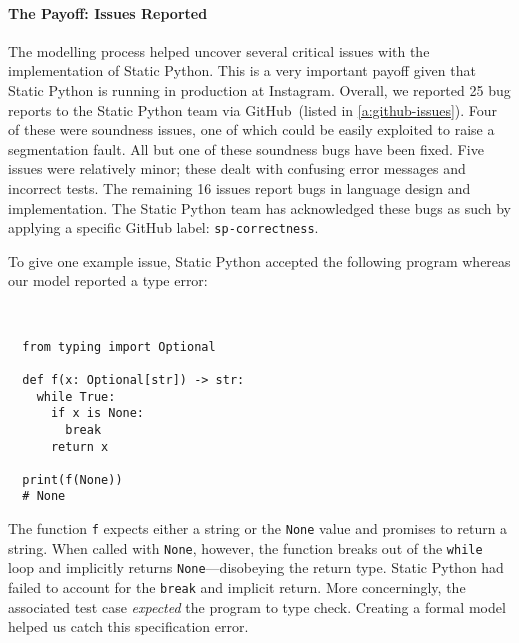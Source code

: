 \documentclass[english,cleveref,submission]{programming}
\newcommand{\SP}{Static Python}
\newcommand{\code}[1]{\texttt{#1}}
\begin{document}
\paragraph{The Payoff: Issues Reported}

The modelling process helped uncover several critical issues with the
implementation of \SP{}.
This is a very important payoff given that \SP{} is running in production at
Instagram.
Overall, we reported 25 bug reports to the \SP{} team via GitHub~(listed in
\cref{a:github-issues}).
Four of these were soundness issues, one of which could be easily exploited to raise
a segmentation fault.
All but one of these soundness bugs have been fixed.
Five issues were relatively minor; these dealt with confusing error messages
and incorrect tests.
The remaining 16 issues report bugs in language design and implementation.
The \SP{} team has acknowledged these bugs as such by applying a specific GitHub label: \lstinline{sp-correctness}.

To give one example issue, \SP{} accepted the following program whereas our model
reported a type error:

\medskip
\begin{minipage}[t]{0.25\columnwidth}~
\end{minipage}\begin{minipage}[t]{0.4\columnwidth}
\begin{lstlisting}
  from typing import Optional

  def f(x: Optional[str]) -> str:
    while True:
      if x is None:
        break
      return x

  print(f(None))
  # None
\end{lstlisting}
\end{minipage}

\noindent{}The function \code{f} expects either a string or the \code{None} value and promises to return a string.
When called with \code{None}, however, the function breaks out of the \code{while} loop
and implicitly returns \code{None}---disobeying the return type.
\SP{} had failed to account for the \code{break} and implicit return.
More concerningly, the associated test case \emph{expected} the program to type check.
Creating a formal model helped us catch this specification error.

\end{document}
